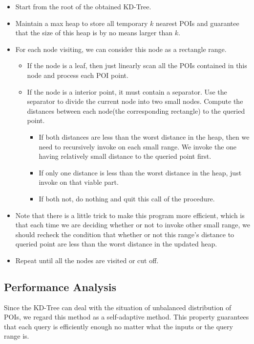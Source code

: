 \documentclass{acm_proc_article-sp}
\begin{document}
\begin{itemize}
\item Start from the root of the obtained KD-Tree.
\item Maintain a max heap to store all temporary $k$ nearest POIs and guarantee that the size of this heap is by no means larger than $k$.
\item For each node visiting, we can consider this node as a rectangle range.
\begin{itemize}
\item If the node is a leaf, then just linearly scan all the POIs contained in this node and process each POI point.
\item If the node is a interior point, it must contain a separator. Use the separator to divide the current node into two small nodes. Compute the distances between each node(the corresponding rectangle) to the queried point. 
\begin{itemize}
\item If both distances are less than the worst distance in the heap, then we need to recursively invoke on each small range. We invoke the one having relatively small distance to the queried point first. 
\item If only one distance is less than the worst distance in the heap, just invoke on that viable part.
\item If both not, do nothing and quit this call of the procedure.
\end{itemize}
\end{itemize}
\item Note that there is a little trick to make this program more efficient, which is that each time we are deciding whether or not to invoke other small range, we should recheck the condition that whether or not this range's distance to queried point are less than the worst distance in the updated heap.
\item Repeat until all the nodes are visited or cut off.
\end{itemize}

\subsection{Performance Analysis}

Since the KD-Tree can deal with the situation of unbalanced distribution of POIs, we regard this method as a self-adaptive method. This property guarantees that each query is efficiently enough no matter what the inputs or the query range is.
\end{document}
